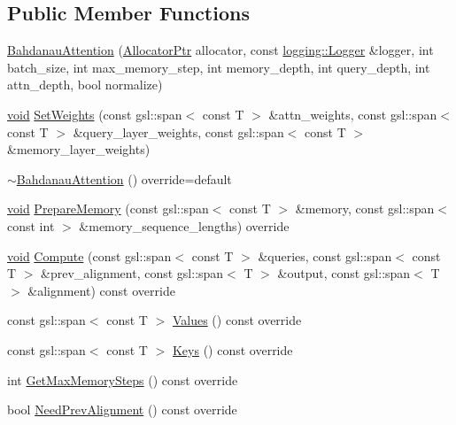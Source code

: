 \subsection*{Public Member Functions}
\begin{DoxyCompactItemize}
\item 
\mbox{\hyperlink{classonnxruntime_1_1contrib_1_1BahdanauAttention_a6fe0ac03a08f81da46654f9a007eb694}{Bahdanau\+Attention}} (\mbox{\hyperlink{namespaceonnxruntime_a6cdac724c5dcefded3a63f08dae58fda}{Allocator\+Ptr}} allocator, const \mbox{\hyperlink{classonnxruntime_1_1logging_1_1Logger}{logging\+::\+Logger}} \&logger, int batch\+\_\+size, int max\+\_\+memory\+\_\+step, int memory\+\_\+depth, int query\+\_\+depth, int attn\+\_\+depth, bool normalize)
\item 
\mbox{\hyperlink{mlasi_8h_a88f941d423cb2a819b70a1358982b1a6}{void}} \mbox{\hyperlink{classonnxruntime_1_1contrib_1_1BahdanauAttention_ad112084986ececc5b02cd220618c7b50}{Set\+Weights}} (const gsl\+::span$<$ const T $>$ \&attn\+\_\+weights, const gsl\+::span$<$ const T $>$ \&query\+\_\+layer\+\_\+weights, const gsl\+::span$<$ const T $>$ \&memory\+\_\+layer\+\_\+weights)
\item 
\mbox{\hyperlink{classonnxruntime_1_1contrib_1_1BahdanauAttention_a7637179eabcbea93b45814dec9cbe106}{$\sim$\+Bahdanau\+Attention}} () override=default
\item 
\mbox{\hyperlink{mlasi_8h_a88f941d423cb2a819b70a1358982b1a6}{void}} \mbox{\hyperlink{classonnxruntime_1_1contrib_1_1BahdanauAttention_a085f7b9b141b95925abab3a5fffbb31f}{Prepare\+Memory}} (const gsl\+::span$<$ const T $>$ \&memory, const gsl\+::span$<$ const int $>$ \&memory\+\_\+sequence\+\_\+lengths) override
\item 
\mbox{\hyperlink{mlasi_8h_a88f941d423cb2a819b70a1358982b1a6}{void}} \mbox{\hyperlink{classonnxruntime_1_1contrib_1_1BahdanauAttention_a6cfed160f597d36d06d3519513ee9295}{Compute}} (const gsl\+::span$<$ const T $>$ \&queries, const gsl\+::span$<$ const T $>$ \&prev\+\_\+alignment, const gsl\+::span$<$ T $>$ \&output, const gsl\+::span$<$ T $>$ \&alignment) const override
\item 
const gsl\+::span$<$ const T $>$ \mbox{\hyperlink{classonnxruntime_1_1contrib_1_1BahdanauAttention_af6a80756c3478056a61d6513e586ea8b}{Values}} () const override
\item 
const gsl\+::span$<$ const T $>$ \mbox{\hyperlink{classonnxruntime_1_1contrib_1_1BahdanauAttention_afc0509bb32e8e067ebcb7529d7a9c248}{Keys}} () const override
\item 
int \mbox{\hyperlink{classonnxruntime_1_1contrib_1_1BahdanauAttention_a97cf203e5f792cd85f1213c744ed63e7}{Get\+Max\+Memory\+Steps}} () const override
\item 
bool \mbox{\hyperlink{classonnxruntime_1_1contrib_1_1BahdanauAttention_a1c21100a19fdbf8596cfffbe3db84661}{Need\+Prev\+Alignment}} () const override
\end{DoxyCompactItemize}


